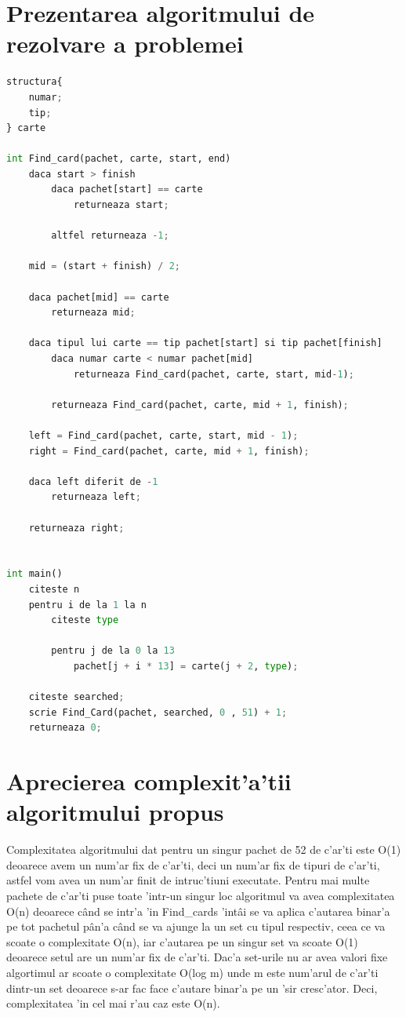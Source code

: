 \vspace{10mm}
\section{Prezentarea algoritmului de rezolvare a problemei}

\begin{lstlisting}[language=Python]
structura{
	numar;
	tip;
} carte

int Find_card(pachet, carte, start, end)
	daca start > finish
		daca pachet[start] == carte
			returneaza start;
	
		altfel returneaza -1;

	mid = (start + finish) / 2;
	
	daca pachet[mid] == carte
		returneaza mid;

	daca tipul lui carte == tip pachet[start] si tip pachet[finish]
		daca numar carte < numar pachet[mid]
			returneaza Find_card(pachet, carte, start, mid-1);

		returneaza Find_card(pachet, carte, mid + 1, finish);

	left = Find_card(pachet, carte, start, mid - 1);
	right = Find_card(pachet, carte, mid + 1, finish);

	daca left diferit de -1
		returneaza left;

	returneaza right;


int main()
	citeste n
	pentru i de la 1 la n
		citeste type 
		
		pentru j de la 0 la 13
			pachet[j + i * 13] = carte(j + 2, type);

	citeste searched;
	scrie Find_Card(pachet, searched, 0 , 51) + 1;
	returneaza 0;
\end{lstlisting}

\vspace{10mm}
\section{Aprecierea complexit'a'tii algoritmului propus}
\myindent
Complexitatea algoritmului dat pentru un singur pachet de 52 de c'ar'ti este O(1) deoarece avem un num'ar fix de c'ar'ti, deci un num'ar fix de tipuri de c'ar'ti, astfel vom avea un num'ar finit de intruc'tiuni executate. Pentru mai multe pachete de c'ar'ti puse toate 'intr-un singur loc algoritmul va avea complexitatea O(n) deoarece c\^and se intr'a 'in Find\_cards 'int\^ai se va aplica c'autarea binar'a pe tot pachetul p\^an'a c\^and se va ajunge la un set cu tipul respectiv, ceea ce va scoate o complexitate O(n), iar c'autarea pe un singur set va scoate O(1) deoarece setul are un num'ar fix de c'ar'ti. Dac'a set-urile nu ar avea valori fixe algortimul ar scoate o complexitate O(log m) unde m este num'arul de c'ar'ti dintr-un set deoarece s-ar fac face c'autare binar'a pe un 'sir cresc'ator. Deci, complexitatea 'in cel mai r'au caz este O(n).

